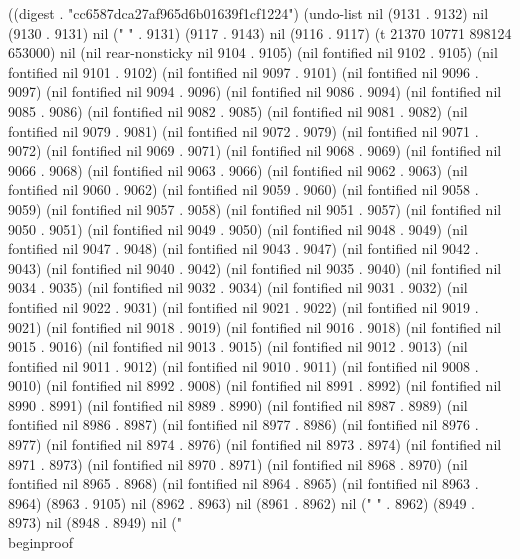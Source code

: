 
((digest . "cc6587dca27af965d6b01639f1cf1224") (undo-list nil (9131 . 9132) nil (9130 . 9131) nil (" " . 9131) (9117 . 9143) nil (9116 . 9117) (t 21370 10771 898124 653000) nil (nil rear-nonsticky nil 9104 . 9105) (nil fontified nil 9102 . 9105) (nil fontified nil 9101 . 9102) (nil fontified nil 9097 . 9101) (nil fontified nil 9096 . 9097) (nil fontified nil 9094 . 9096) (nil fontified nil 9086 . 9094) (nil fontified nil 9085 . 9086) (nil fontified nil 9082 . 9085) (nil fontified nil 9081 . 9082) (nil fontified nil 9079 . 9081) (nil fontified nil 9072 . 9079) (nil fontified nil 9071 . 9072) (nil fontified nil 9069 . 9071) (nil fontified nil 9068 . 9069) (nil fontified nil 9066 . 9068) (nil fontified nil 9063 . 9066) (nil fontified nil 9062 . 9063) (nil fontified nil 9060 . 9062) (nil fontified nil 9059 . 9060) (nil fontified nil 9058 . 9059) (nil fontified nil 9057 . 9058) (nil fontified nil 9051 . 9057) (nil fontified nil 9050 . 9051) (nil fontified nil 9049 . 9050) (nil fontified nil 9048 . 9049) (nil fontified nil 9047 . 9048) (nil fontified nil 9043 . 9047) (nil fontified nil 9042 . 9043) (nil fontified nil 9040 . 9042) (nil fontified nil 9035 . 9040) (nil fontified nil 9034 . 9035) (nil fontified nil 9032 . 9034) (nil fontified nil 9031 . 9032) (nil fontified nil 9022 . 9031) (nil fontified nil 9021 . 9022) (nil fontified nil 9019 . 9021) (nil fontified nil 9018 . 9019) (nil fontified nil 9016 . 9018) (nil fontified nil 9015 . 9016) (nil fontified nil 9013 . 9015) (nil fontified nil 9012 . 9013) (nil fontified nil 9011 . 9012) (nil fontified nil 9010 . 9011) (nil fontified nil 9008 . 9010) (nil fontified nil 8992 . 9008) (nil fontified nil 8991 . 8992) (nil fontified nil 8990 . 8991) (nil fontified nil 8989 . 8990) (nil fontified nil 8987 . 8989) (nil fontified nil 8986 . 8987) (nil fontified nil 8977 . 8986) (nil fontified nil 8976 . 8977) (nil fontified nil 8974 . 8976) (nil fontified nil 8973 . 8974) (nil fontified nil 8971 . 8973) (nil fontified nil 8970 . 8971) (nil fontified nil 8968 . 8970) (nil fontified nil 8965 . 8968) (nil fontified nil 8964 . 8965) (nil fontified nil 8963 . 8964) (8963 . 9105) nil (8962 . 8963) nil (8961 . 8962) nil (" " . 8962) (8949 . 8973) nil (8948 . 8949) nil ("\\begin{proof}
 
